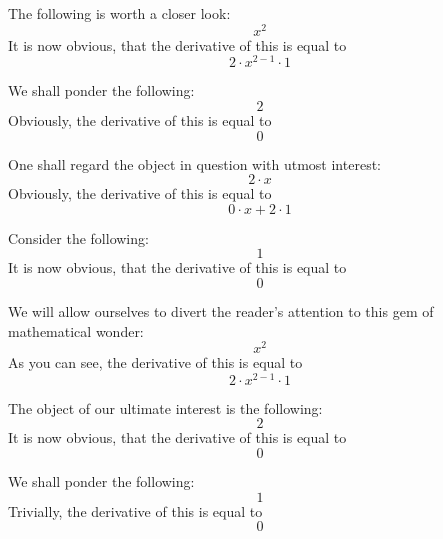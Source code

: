 \documentclass{article}
\begin{document}
The following is worth a closer look:
\begin{equation}
x ^{2 } 
\end{equation}
It is now obvious, that the derivative of this is equal to
\begin{equation}
2 \cdot x ^{2 - 1 } \cdot 1 
\end{equation}

We shall ponder the following:
\begin{equation}
2 
\end{equation}
Obviously, the derivative of this is equal to
\begin{equation}
0 
\end{equation}

One shall regard the object in question with utmost interest:
\begin{equation}
2 \cdot x 
\end{equation}
Obviously, the derivative of this is equal to
\begin{equation}
0 \cdot x + 2 \cdot 1 
\end{equation}

Consider the following:
\begin{equation}
1 
\end{equation}
It is now obvious, that the derivative of this is equal to
\begin{equation}
0 
\end{equation}

We will allow ourselves to divert the reader's attention to this gem of mathematical wonder:
\begin{equation}
x ^{2 } 
\end{equation}
As you can see, the derivative of this is equal to
\begin{equation}
2 \cdot x ^{2 - 1 } \cdot 1 
\end{equation}

The object of our ultimate interest is the following:
\begin{equation}
2 
\end{equation}
It is now obvious, that the derivative of this is equal to
\begin{equation}
0 
\end{equation}

We shall ponder the following:
\begin{equation}
1 
\end{equation}
Trivially, the derivative of this is equal to
\begin{equation}
0 
\end{equation}
\end{document}
